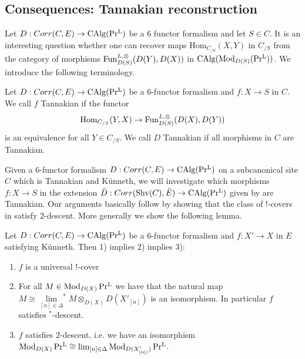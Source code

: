 \subsection{Consequences: Tannakian reconstruction}\label{Consequences: Tannakian lifting}
Let $D: Corr(C,E)\to \operatorname{CAlg}(\operatorname{Pr^{L}})$ be a $6$ functor formalism and let $S \in C$. It is an interesting question whether one can recover maps $\text{Hom}_{C_{/S}}(X,Y)$ in $C_{/S}$ from the category of morphisms $\operatorname{Fun}_{D(S)}^{L,\otimes}(D(Y),D(X))$ in $\operatorname{CAlg}(\operatorname{Mod}_{D(S)}(\operatorname{Pr^{L}}))$. We introduce the following terminology.
\begin{definition}\label{tannakian morphism}
  Let $D: Corr(C,E)\to \operatorname{CAlg}(\operatorname{Pr^{L}})$ be a $6$-functor formalism and $f: X \to S$ in $C$. We call $f$ Tannakian if the functor 
  \[
 \text{Hom}_{C_{/S}}(Y,X) \to \operatorname{Fun}_{D(S)}^{L,\otimes}(D(X),D(Y))
  \]
  is an equivalence for all $Y \in C_{/S}$. We call $D$ Tannakian if all morphisms in $C$ are Tannakian.
\end{definition}
Given a $6$-functor formalism $D: Corr(C,E)\to \operatorname{CAlg}(\operatorname{Pr^{L}})$ on a subcanonical site $C$ which is Tannakian and Künneth, we will investigate which morphisms $f :X \to S$ in the extension $\tilde{D}: Corr(\operatorname{Shv}(C),\tilde{E})\to \operatorname{CAlg}(\operatorname{Pr^{L}})$ given by  are Tannakian.  Our arguments basically follow \Cite[Section 4]{stefanich2023tannaka} by showing that the class of $!$-covers in  satisfy $2$-descent. More generally we show the following lemma.
\begin{lemma}\label{shrik descent implies 2 descent}
Let $D: Corr(C,E)\to \operatorname{CAlg}(\operatorname{Pr^{L}})$ be a $6$-functor formalism and $f: X' \to X$ in $E$ satisfying Künneth. Then 1) implies 2) implies 3):
\begin{enumerate}
    \item $f$ is a universal $!$-cover
    \item For all $M\in \operatorname{Mod}_{D(X)}\operatorname{Pr^{L}}$ we have that the natural map $M \cong \underset{[n]\in \Delta}{\lim}^* M \otimes_{D(X)}D(X'_{[n]})$ is an isomorphism. In particular $f$ satisfies $^*$-descent.
    \item $f$ satisfies $2$-descent, i.e. we have an isomorphism $\operatorname{Mod}_{D(X)}\operatorname{Pr^{L}} \cong \lim_{[n]\in \Delta} \operatorname{Mod}_{D(X'_{[n])})}\operatorname{Pr^{L}} $.
\end{enumerate}
\end{lemma}

